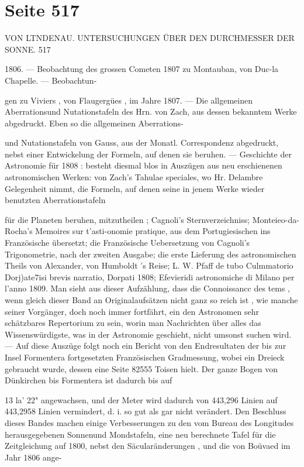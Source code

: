 \documentclass[10pt,a4paper]{article}
\begin{document}
\newpage
\section*{Seite 517}
VON LTNDENAU. UNTERSUCHUNGEN ÜBER DEN DURCHMESSER DER SONNE. 517

1806. — Beobachtung des grossen Cometen 1807 zu Montauban, von Duc-la Chapelle. — Beobachtun-

gen zu Viviers , von Flaugergües , im Jahre 1807. — Die allgemeinen Aberrationsund Nutationstafeln des Hrn. von Zach, aus dessen bekanntem Werke abgedruckt. Eben so die allgemeinen Aberrations-

und Nutationstafeln von Gauss, aus der Monatl. Correspondenz abgedruckt, nebst einer Entwickelung der Formeln, auf denen sie beruhen. — Geschichte der Astronomie für 1808 : besteht diesmal blos in Auszügen aus neu erschienenen astronomischen Werken: von Zach's Tahulae speciales, wo Hr. Delambre Gelegenheit nimmt, die Formeln, auf denen seine in jenem Werke wieder benutzten Aberrationstafeln

für die Planeten beruhen, mitzutheilen ; Cagnoli's Sternverzeichniss; Monteieo-da-Rocha's Memoires sur t'asti-onomie pratique, aus dem Portugiesischen ins Französische übersetzt; die Französische Uebersetzung von Cagnoli's Trigonometrie, nach der zweiten Ausgabe; die erste Lieferung des astronomischen Theils von Alexander, von Humboldt 's Reise; L. W. Pfaff de tubo Culmmatorio Dorj)ate7isi brevis narratio, Dorpati 1808; Efevieridi astronomiche di Milano per l'anno 1809. Man sieht aus dieser Aufzählung, dass die Connoissancc des tems , wenn gleich dieser Band an Originalaufsätzen nicht ganz so reich ist , wie manche seiner Vorgänger, doch noch immer fortfährt, ein den Astronomen sehr schätzbares Repertorium zu sein, worin man Nachrichten über alles das Wissenswürdigste, was in der Astronomie geschieht, nicht umsonst suchen wird. — Auf diese Auszüge folgt noch ein Bericht von den Endresultaten der bis zur Insel Formentera fortgesetzten Französischen Gradmessung, wobei ein Dreieck gebraucht wurde, dessen eine Seite 82555 Toisen hielt. Der ganze Bogen von Dünkirchen bis Formentera ist dadurch bis auf

13\textdegree{} la' 22" angewachsen, und der Meter wird dadurch von 443,296 Linien auf 443,2958 Linien vermindert, d. i. so gut als gar nicht verändert. Den Beschluss dieses Bandes machen einige Verbesserungen zu den vom Bureau des Longitudes herausgegebenen Sonnenund Mondstafeln, eine neu berechnete Tafel für die Zeitgleichung auf 1800, nebst den Säcularänderungen , und die von Boüvaed im Jahr 1806 ange-
\end{document}
